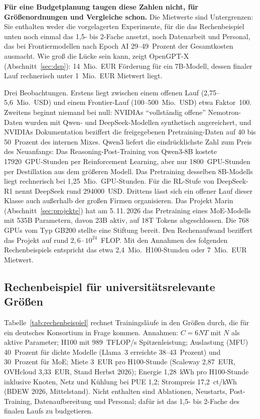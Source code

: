 \documentclass[a4paper,11pt]{article}
\begin{document}
\textbf{Für eine Budgetplanung taugen diese Zahlen nicht, für
  Größenordnungen und Vergleiche schon.} Die Mietwerte sind
Untergrenzen: Sie enthalten weder die vorgelagerten Experimente, für
die das Rechenbeispiel unten noch einmal das 1,5- bis 2-Fache ansetzt,
noch Datenarbeit und Personal, das bei Frontiermodellen nach Epoch AI
29--49~Prozent der Gesamtkosten ausmacht. Wie groß die Lücke sein
kann, zeigt OpenGPT-X (Abschnitt~\ref{sec:dsp}): 14~Mio.\ EUR Förderung
für ein 7B-Modell, dessen finaler Lauf rechnerisch unter 1~Mio.\ EUR
Mietwert liegt.

Drei Beobachtungen. Erstens liegt zwischen einem offenen Lauf
(2,75--5,6~Mio.\ USD) und einem Frontier-Lauf (100--500~Mio.\ USD)
etwa Faktor~100. Zweitens beginnt niemand bei null: NVIDIAs
\enquote{vollständig offene} Nemotron-Daten wurden mit Qwen- und
DeepSeek-Modellen synthetisch angereichert, und NVIDIAs Dokumentation
beziffert die freigegebenen Pretraining-Daten auf 40 bis 50~Prozent
des internen Mixes. Qwen3 liefert die eindrücklichste Zahl zum Preis
des Neuanfangs: Das Reasoning-Post-Training von Qwen3-8B kostete
\num{17920}~GPU-Stunden per Reinforcement Learning, aber nur
\num{1800}~GPU-Stunden per Destillation aus dem größeren Modell. Das
Pretraining desselben 8B-Modells liegt rechnerisch bei 1,25~Mio.\
GPU-Stunden. Für die RL-Stufe von DeepSeek-R1 nennt DeepSeek rund
\num{294000}~USD.  Drittens lässt sich ein offener Lauf dieser Klasse
auch außerhalb der großen Firmen organisieren.  Das Projekt Marin
(Abschnitt~\ref{sec:projekte}) hat am 5.\,11.\,2026 das Pretraining
eines MoE-Modells mit 535B Parametern, davon 23B aktiv, auf 18T
Tokens abgeschlossen.  Die 768 GPUs vom Typ GB200 stellte eine
Stiftung bereit.  Den Rechenaufwand beziffert das Projekt auf rund
$2{,}6\cdot 10^{24}$~FLOP.  Mit den Annahmen des folgenden
Rechenbeispiels entspricht das etwa 2,4~Mio.\ H100-Stunden oder
7~Mio.\ EUR Mietwert.

\subsection{Rechenbeispiel für universitätsrelevante Größen}

Tabelle~\ref{tab:rechenbeispiel} rechnet Trainingsläufe in den Größen
durch, die für ein deutsches Konsortium in Frage kommen. Annahmen:
$C = 6NT$ mit $N$ als aktive Parameter; H100 mit 989~TFLOP/s
Spitzenleistung; Auslastung (MFU) 40~Prozent für dichte Modelle
(Llama~3 erreichte 38--43~Prozent) und 30~Prozent für MoE; Miete
3~EUR pro H100-Stunde (Scaleway 2,87~EUR, OVHcloud 3,33~EUR, Stand
Herbst 2026); Energie 1,28~kWh pro H100-Stunde inklusive Knoten, Netz
und Kühlung bei PUE 1,2; Strompreis 17,2~ct/kWh (BDEW 2026,
Mittelstand). Nicht enthalten sind Ablationen, Neustarts,
Post-Training, Datenaufbereitung und Personal; dafür ist das 1,5- bis
2-Fache des finalen Laufs zu budgetieren.
\end{document}

